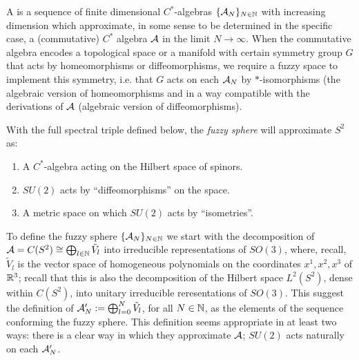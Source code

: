     

A  is a sequence of finite dimensional $C^*$-algebras $\{\mathcal A_N\}_{N \in \mathbb{N}}$ with increasing dimension which approximate, in some sense to be determined in the specific case, a (commutative) $C^*$ algebra $\mathcal A$ in the limit $N \to \infty$. When the commutative algebra encodes a topological space or a manifold with certain symmetry group $G$ that acts by homeomorphisms or diffeomorphisms, we require a fuzzy space to implement this symmetry, i.e. that $G$ acts on each $\mathcal A_N$ by $*$-isomorphisms (the algebraic version of homeomorphisms and in a way compatible with the derivations of $\mathcal A$ (algebraic version of diffeomorphisms).

With the full spectral triple defined below, the \textit{fuzzy sphere} will approximate $S^2$ as:
    
    \begin{enumerate}
    
    \item A $C^*$-algebra acting on the Hilbert space of spinors.
    
    \item $SU(2)$ acts by ``diffeomorphisms'' on the space.
    
    \item A metric space on which $SU(2)$ acts by ``isometries''.
    
    \end{enumerate}

\lin 

To define the fuzzy sphere $\{\mathcal A_N\}_{N \in \mathbb{N}}$ we start with the decomposition of $\textcolor{black}{\mathcal A} = C(S^2) \cong \bigoplus_{l \in \mathbb{N}} \tilde V_l$  into irreducible representations of $SO(3)$, where, recall, $\tilde V_l$ is the vector space of homogeneous polynomials on the coordinates $x^1, x^2, x^3$ of $\mathbb{R}^3$; recall that this is also the decomposition of the Hilbert space $L^2(S^2)$, dense within $C(S^2)$, into unitary irreducible reresentations of $SO(3)$. This suggest the definition of $\textcolor{black}{\mathcal A'_N} := \bigoplus_{l = 0}^N \tilde V_l$, for all $N \in \mathbb{N}$, as the elements of the sequence conforming the fuzzy sphere. This definition seems appropriate in at least two ways: there is a clear way in which they approximate $\mathcal A$; $SU(2)$ acts naturally on each $\mathcal A_N'$.

